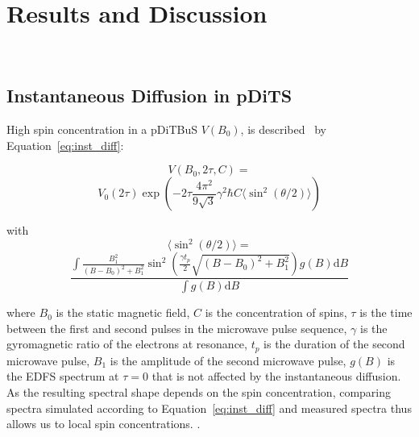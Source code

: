 \chapter{Results and Discussion}
\label{ch:results}

\
\section{Instantaneous Diffusion in pDiTS}
High spin concentration in a pDiTBuS   $V(B_0)$,  is described~\cite{Toropov1998} by Equation~\ref{eq:inst_diff}:

\begin{equation*}
V(B_0, 2\tau, C) =
\end{equation*}
\begin{equation}
\label{eq:inst_diff}
 V_0(2\tau)\exp\left(-2\tau\frac{4\pi^2}{9\sqrt{3}}\gamma^2\hbar C \langle\sin^2(\theta/2)\rangle\right)
\end{equation}


with
\begin{equation*}
\langle\sin^2(\theta/2)\rangle=
\end{equation*}
\begin{equation}
\label{eq:inst_diff2}
\frac{\int{\frac{B_1^2}{(B-B_0)^2+B_1^2}\sin^2\left(\frac{\gamma t_p}{2}\sqrt{(B-B_0)^2 +B_1^2}\right)    g(B)\mathrm{d}B}}   {\int{g(B)\mathrm{d}B}}
\end{equation}

where $B_0$ is the static magnetic field, $C$ is the concentration of spins, $\tau$ is the time between the first and second pulses in the microwave pulse sequence, $\gamma$ is the gyromagnetic ratio of the electrons at resonance, $t_p$ is the duration of the second microwave pulse, $B_1$ is the amplitude of the second microwave pulse, $g(B)$ is the EDFS spectrum at $\tau=0$ that is not affected by the instantaneous diffusion. As the resulting spectral shape depends on the spin concentration, comparing spectra simulated according to Equation~\ref{eq:inst_diff} and measured spectra thus allows us to  local spin concentrations. .\\

